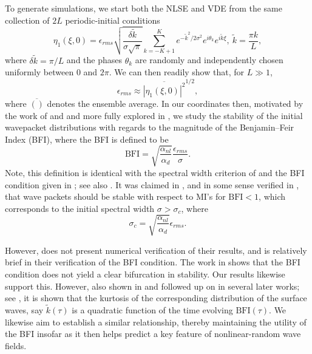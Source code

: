 \documentclass[a4paper,11pt]{article}
\begin{document}
To generate simulations, we start both the NLSE and VDE from the same collection of $2L$ periodic-initial conditions
\[
\eta_{1}(\xi,0) = \epsilon_{rms}\sqrt{\frac{\delta \tilde{k}}{\sigma\sqrt{\pi}}} \sum_{k=-K+1}^{K}e^{-\tilde{k}^{2}/2\sigma^{2}}e^{i\theta_{k}}e^{i\tilde{k}\xi}, ~ \tilde{k} = \frac{\pi k}{L},
\]
where $\delta \tilde{k}=\pi/L$ and the phases $\theta_{k}$ are randomly and independently chosen uniformly between $0$ and $2\pi$.  We can then readily show that, for $L\gg 1$, 
\[
\epsilon_{rms} \approx \overline{\left|\eta_{1}(\xi,0)\right|^{2}}^{1/2},
\]
where $\overline{()}$ denotes the ensemble average.  In our coordinates then, motivated by the work of \cite{alber} and \cite{dysthe2} and more fully explored in \cite{janssen}, we study the stability of the initial wavepacket distributions with regards to the magnitude of the Benjamin--Feir Index (BFI), where the BFI is defined to be  
\[
\mbox{BFI} = \sqrt{\frac{\alpha_{nl}}{\alpha_{d}}}\frac{\epsilon_{rms}}{\sigma}.
\]
Note, this definition is identical with the spectral width criterion of \cite{alber} and the BFI condition given in \cite{thomas2012nonlinear}; see also \cite{onorato}.  It was claimed in \cite{alber}, and in some sense verified in \cite{dysthe2}, that wave packets should be stable with respect to MI's for $\mbox{BFI}<1$, which corresponds to the initial spectral width $\sigma>\sigma_{c}$, where 
\[
\sigma_{c} = \sqrt{\frac{\alpha_{nl}}{\alpha_{d}}}\epsilon_{rms}.
\]

However, \cite{alber} does not present numerical verification of their results, and \cite{dysthe2} is relatively brief in their verification of the BFI condition.  The work in \cite{janssen} shows that the BFI condition does not yield a clear bifurcation in stability.  Our results likewise support this.  However, also shown in \cite{janssen} and followed up on in several later works; see \cite{onorato,slunyaev,eeltink}, it is shown that the kurtosis of the corresponding distribution of the surface waves, say $\tilde{k}(\tau)$ is a quadratic function of the time evolving $\mbox{BFI}(\tau)$.   We likewise aim to establish a similar relationship, thereby maintaining the utility of the BFI insofar as it then helps predict a key feature of nonlinear-random wave fields. 
\end{document}
